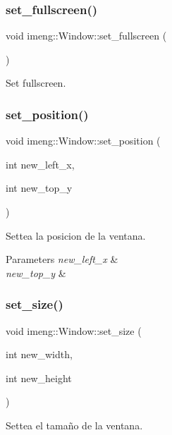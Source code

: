 \subsubsection{set\_fullscreen()}
{\footnotesize\ttfamily void imeng\+::\+Window\+::set\+\_\+fullscreen (\begin{DoxyParamCaption}{ }\end{DoxyParamCaption})}



Set fullscreen. 

\mbox{\label{classimeng_1_1_window_ae167cfef48babbeab5deaf2956eaf600}} 
\subsubsection{set\_position()}
{\footnotesize\ttfamily void imeng\+::\+Window\+::set\+\_\+position (\begin{DoxyParamCaption}\item[{int}]{new\+\_\+left\+\_\+x,  }\item[{int}]{new\+\_\+top\+\_\+y }\end{DoxyParamCaption})}



Settea la posicion de la ventana. 


\begin{DoxyParams}{Parameters}
{\em new\+\_\+left\+\_\+x} & \\
\hline
{\em new\+\_\+top\+\_\+y} & \\
\hline
\end{DoxyParams}
\mbox{\label{classimeng_1_1_window_a33ed2a9ff3a6d04ea72f7bd19b40d394}} 
\subsubsection{set\_size()}
{\footnotesize\ttfamily void imeng\+::\+Window\+::set\+\_\+size (\begin{DoxyParamCaption}\item[{int}]{new\+\_\+width,  }\item[{int}]{new\+\_\+height }\end{DoxyParamCaption})}



Settea el tamaño de la ventana. 



